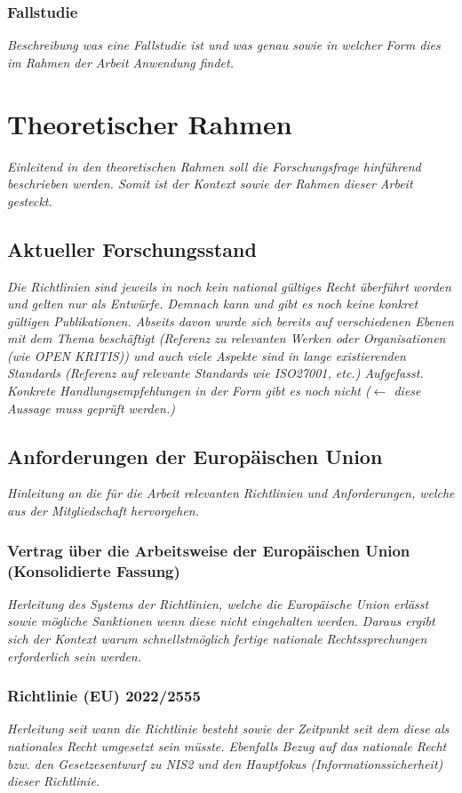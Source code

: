 \documentclass[11pt,a4paper]{article}   %
\begin{document}
            \subsubsection{Fallstudie}
                \emph{Beschreibung was eine Fallstudie ist und was genau sowie in welcher Form dies im Rahmen der Arbeit Anwendung findet.}

    
    \newpage
    \section{Theoretischer Rahmen}
        \emph{Einleitend in den theoretischen Rahmen soll die Forschungsfrage hinführend beschrieben werden. Somit ist der Kontext sowie der Rahmen dieser Arbeit gesteckt.}
        \subsection{Aktueller Forschungsstand}
            \emph{Die Richtlinien sind jeweils in noch kein national gültiges Recht überführt worden und gelten nur als Entwürfe. Demnach kann und gibt es noch keine konkret gültigen Publikationen. Abseits davon wurde sich bereits auf verschiedenen Ebenen mit dem Thema beschäftigt (Referenz zu relevanten Werken oder Organisationen (wie OPEN KRITIS)) und auch viele Aspekte sind in lange existierenden Standards (Referenz auf relevante Standards wie ISO27001, etc.) Aufgefasst. Konkrete Handlungsempfehlungen in der Form gibt es noch nicht ($\leftarrow$ diese Aussage muss geprüft werden.)}
        \subsection{Anforderungen der Europäischen Union}
            \emph{Hinleitung an die für die Arbeit relevanten Richtlinien und Anforderungen, welche aus der Mitgliedschaft hervorgehen.}
            \subsubsection{Vertrag über die Arbeitsweise der Europäischen Union (Konsolidierte Fassung)}
                \emph{Herleitung des Systems der Richtlinien, welche die Europäische Union erlässt sowie mögliche Sanktionen wenn diese nicht eingehalten werden. Daraus ergibt sich der Kontext warum schnellstmöglich fertige nationale Rechtssprechungen erforderlich sein werden.}
            \subsubsection{Richtlinie (EU) 2022/2555}
                \emph{Herleitung seit wann die Richtlinie besteht sowie der Zeitpunkt seit dem diese als nationales Recht umgesetzt sein müsste. Ebenfalls Bezug auf das nationale Recht bzw. den Gesetzesentwurf zu NIS2 und den Hauptfokus (Informationssicherheit) dieser Richtlinie.}
\end{document}
